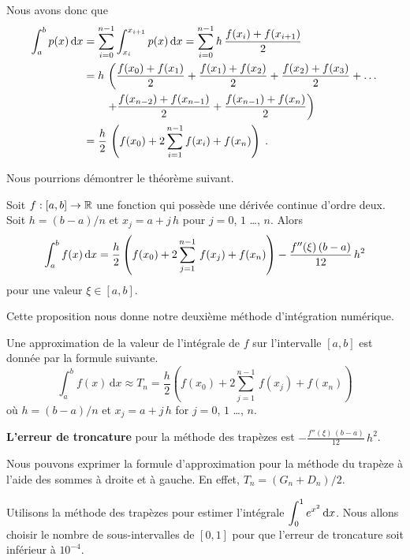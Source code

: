{Nous avons donc que
\begin{align*}
\int_a^b p(x) \,\mathrm{d}x &= \sum_{i=0}^{n-1} \int_{x_i}^{x_{i+1}}p(x)  \,\mathrm{d}x
= \sum_{i=0}^{n-1} h \,\frac{f(x_{i})+f(x_{i+1})}{2} \\
&= h\,\left( \frac{f(x_0)+f(x_1)}{2}
+\frac{f(x_1)+f(x_2)}{2} + \frac{f(x_2)+f(x_3)}{2} + \ldots \right. \\
&\qquad \left. +\frac{f(x_{n-2})+f(x_{n-1})}{2} +\frac{f(x_{n-1})+f(x_n)}{2}
 \right) \\
&=\frac{h}{2}\,\left( f(x_0) + 2 \sum_{i=1}^{n-1} f(x_i) + f(x_n) \right) \; .
\end{align*}

Nous pourrions démontrer le théorème suivant.

\begin{prop}
Soit $f:[a,b]\rightarrow \mathbb{R}$ une fonction qui possède une dérivée
continue d'ordre deux.  Soit $h=(b-a)/n$ et $x_j = a+j\,h$ pour $j=0$,
$1$ \ldots, $n$.  Alors
\[
\int_{a}^{b} f(x)\,\mathrm{d}x = \frac{h}{2} \left( f(x_0) + 2\sum_{j=1}^{n-1}\,f(x_j)
+ f(x_n) \right) - \frac{f''(\xi)\,(b-a)}{12}\,h^2
\]
pour une valeur $\xi \in [a,b]$.
\end{prop}

Cette proposition nous donne notre deuxième méthode d'intégration
numérique.

\begin{meth}
Une approximation de la valeur de l'intégrale de $f$ sur l'intervalle
$[a,b]$ est donnée par la formule suivante.
\[
\int_{a}^{b} f(x)\,\text{d}x \approx T_n =
\frac{h}{2} \left( f(x_0) + 2 \sum_{j=1}^{n-1}\,f(x_j) + f(x_n) \right)
\]
où $h=(b-a)/n$ et $x_j = a+j\,h$ for $j=0$, $1$ \ldots, $n$.

{\bfseries L'erreur de troncature}
pour la méthode des trapèzes est
$\displaystyle - \frac{f''(\xi)\,(b-a)}{12}\,h^2$.
\label{CTR}
\end{meth}

\begin{rmk}
Nous pouvons exprimer la formule d'approximation pour la méthode du trapèze
à l'aide des sommes à droite et à gauche.  En effet, $T_n = ( G_n + D_n)/2$.
\end{rmk}

\begin{egg}
Utilisons la méthode des trapèzes pour estimer l'intégrale
$\displaystyle \int_0^1 e^{x^2}\,\mathrm{d}x$.  Nous allons choisir le nombre de
sous-intervalles de $[0,1]$ pour que l'erreur de troncature soit
inférieur à $10^{-4}$.


\end{egg}}
